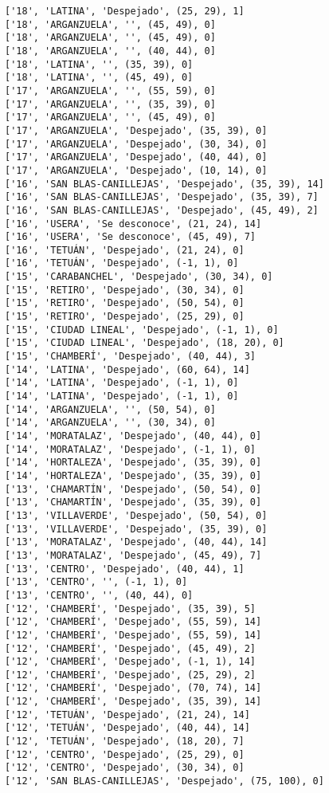 \documentclass[11pt]{article}
\begin{document}
\begin{Verbatim}[commandchars=\\\{\}]
['18', 'LATINA', 'Despejado', (25, 29), 1]
['18', 'ARGANZUELA', '', (45, 49), 0]
['18', 'ARGANZUELA', '', (45, 49), 0]
['18', 'ARGANZUELA', '', (40, 44), 0]
['18', 'LATINA', '', (35, 39), 0]
['18', 'LATINA', '', (45, 49), 0]
['17', 'ARGANZUELA', '', (55, 59), 0]
['17', 'ARGANZUELA', '', (35, 39), 0]
['17', 'ARGANZUELA', '', (45, 49), 0]
['17', 'ARGANZUELA', 'Despejado', (35, 39), 0]
['17', 'ARGANZUELA', 'Despejado', (30, 34), 0]
['17', 'ARGANZUELA', 'Despejado', (40, 44), 0]
['17', 'ARGANZUELA', 'Despejado', (10, 14), 0]
['16', 'SAN BLAS-CANILLEJAS', 'Despejado', (35, 39), 14]
['16', 'SAN BLAS-CANILLEJAS', 'Despejado', (35, 39), 7]
['16', 'SAN BLAS-CANILLEJAS', 'Despejado', (45, 49), 2]
['16', 'USERA', 'Se desconoce', (21, 24), 14]
['16', 'USERA', 'Se desconoce', (45, 49), 7]
['16', 'TETUÁN', 'Despejado', (21, 24), 0]
['16', 'TETUÁN', 'Despejado', (-1, 1), 0]
['15', 'CARABANCHEL', 'Despejado', (30, 34), 0]
['15', 'RETIRO', 'Despejado', (30, 34), 0]
['15', 'RETIRO', 'Despejado', (50, 54), 0]
['15', 'RETIRO', 'Despejado', (25, 29), 0]
['15', 'CIUDAD LINEAL', 'Despejado', (-1, 1), 0]
['15', 'CIUDAD LINEAL', 'Despejado', (18, 20), 0]
['15', 'CHAMBERÍ', 'Despejado', (40, 44), 3]
['14', 'LATINA', 'Despejado', (60, 64), 14]
['14', 'LATINA', 'Despejado', (-1, 1), 0]
['14', 'LATINA', 'Despejado', (-1, 1), 0]
['14', 'ARGANZUELA', '', (50, 54), 0]
['14', 'ARGANZUELA', '', (30, 34), 0]
['14', 'MORATALAZ', 'Despejado', (40, 44), 0]
['14', 'MORATALAZ', 'Despejado', (-1, 1), 0]
['14', 'HORTALEZA', 'Despejado', (35, 39), 0]
['14', 'HORTALEZA', 'Despejado', (35, 39), 0]
['13', 'CHAMARTÍN', 'Despejado', (50, 54), 0]
['13', 'CHAMARTÍN', 'Despejado', (35, 39), 0]
['13', 'VILLAVERDE', 'Despejado', (50, 54), 0]
['13', 'VILLAVERDE', 'Despejado', (35, 39), 0]
['13', 'MORATALAZ', 'Despejado', (40, 44), 14]
['13', 'MORATALAZ', 'Despejado', (45, 49), 7]
['13', 'CENTRO', 'Despejado', (40, 44), 1]
['13', 'CENTRO', '', (-1, 1), 0]
['13', 'CENTRO', '', (40, 44), 0]
['12', 'CHAMBERÍ', 'Despejado', (35, 39), 5]
['12', 'CHAMBERÍ', 'Despejado', (55, 59), 14]
['12', 'CHAMBERÍ', 'Despejado', (55, 59), 14]
['12', 'CHAMBERÍ', 'Despejado', (45, 49), 2]
['12', 'CHAMBERÍ', 'Despejado', (-1, 1), 14]
['12', 'CHAMBERÍ', 'Despejado', (25, 29), 2]
['12', 'CHAMBERÍ', 'Despejado', (70, 74), 14]
['12', 'CHAMBERÍ', 'Despejado', (35, 39), 14]
['12', 'TETUÁN', 'Despejado', (21, 24), 14]
['12', 'TETUÁN', 'Despejado', (40, 44), 14]
['12', 'TETUÁN', 'Despejado', (18, 20), 7]
['12', 'CENTRO', 'Despejado', (25, 29), 0]
['12', 'CENTRO', 'Despejado', (30, 34), 0]
['12', 'SAN BLAS-CANILLEJAS', 'Despejado', (75, 100), 0]

\end{Verbatim}
\end{document}
